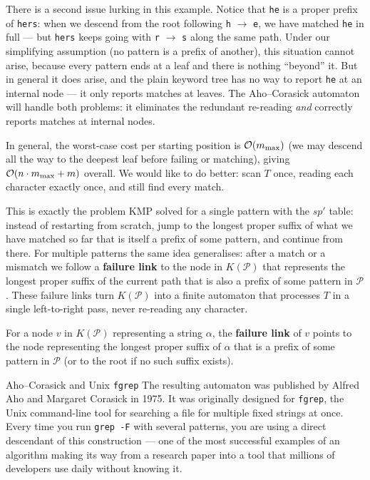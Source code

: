 There is a second issue lurking in this example.
Notice that \texttt{he} is a proper prefix of \texttt{hers}: when we
descend from the root following \texttt{h} $\to$ \texttt{e}, we have
matched \texttt{he} in full --- but \texttt{hers} keeps going with
\texttt{r} $\to$ \texttt{s} along the same path.
Under our simplifying assumption (no pattern is a prefix of another),
this situation cannot arise, because every pattern ends at a leaf and
there is nothing ``beyond'' it.
But in general it does arise, and the plain keyword tree has no way to
report \texttt{he} at an internal node --- it only reports matches at
leaves.
The Aho--Corasick automaton will handle both problems: it eliminates the
redundant re-reading \emph{and} correctly reports matches at internal
nodes.

In general, the worst-case cost per starting position is $\mathcal{O}\!\left(m_{\max}\right)$
(we may descend all the way to the deepest leaf before failing or
matching), giving $\mathcal{O}\!\left(n \cdot m_{\max} + m\right)$ overall.
We would like to do better: scan $T$ once, reading each character exactly
once, and still find every match.

This is exactly the problem KMP solved for a single pattern with the $sp'$
table: instead of restarting from scratch, jump to the longest proper
suffix of what we have matched so far that is itself a prefix of some
pattern, and continue from there.
For multiple patterns the same idea generalises: after a match or a
mismatch we follow a \textbf{failure link} to the node in
$K(\mathcal{P})$ that represents the longest proper suffix of the current
path that is also a prefix of some pattern in $\mathcal{P}$.
These failure links turn $K(\mathcal{P})$ into a finite automaton that
processes $T$ in a single left-to-right pass, never re-reading any
character.

\begin{definition}
  For a node $v$ in $K(\mathcal{P})$ representing a string $\alpha$, the
  \textbf{failure link} of $v$ points to the node representing the longest
  proper suffix of $\alpha$ that is a prefix of some pattern in $\mathcal{P}$
  (or to the root if no such suffix exists).
\end{definition}


\begin{intermezzo}{Aho--Corasick and Unix \texttt{fgrep}}
The resulting automaton was published by Alfred Aho and Margaret Corasick
in 1975.
It was originally designed for \texttt{fgrep}, the Unix command-line tool
for searching a file for multiple fixed strings at once.
Every time you run \texttt{grep -F} with several patterns, you are using
a direct descendant of this construction --- one of the most successful
examples of an algorithm making its way from a research paper into a tool
that millions of developers use daily without knowing it.
\end{intermezzo}

